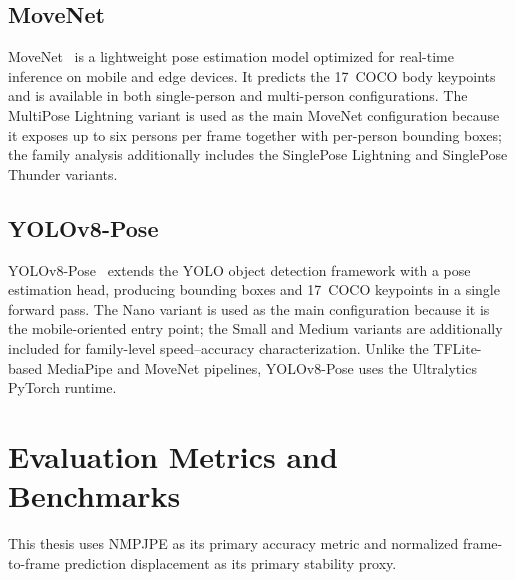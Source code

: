 \subsection{MoveNet}
\label{sec:movenet}

MoveNet~\cite{google2021movenet} is a lightweight pose estimation model optimized for real-time inference on mobile and edge devices. It predicts the 17~COCO body keypoints and is available in both single-person and multi-person configurations. The MultiPose Lightning variant is used as the main MoveNet configuration because it exposes up to six persons per frame together with per-person bounding boxes; the family analysis additionally includes the SinglePose Lightning and SinglePose Thunder variants.

\subsection{YOLOv8-Pose}
\label{sec:yolo}

YOLOv8-Pose~\cite{jocher2023yolov8} extends the YOLO object detection framework with a pose estimation head, producing bounding boxes and 17~COCO keypoints in a single forward pass. The Nano variant is used as the main configuration because it is the mobile-oriented entry point; the Small and Medium variants are additionally included for family-level speed--accuracy characterization. Unlike the TFLite-based MediaPipe and MoveNet pipelines, YOLOv8-Pose uses the Ultralytics PyTorch runtime.


\section{Evaluation Metrics and Benchmarks}
\label{sec:evaluation-metrics}

This thesis uses NMPJPE as its primary accuracy metric and normalized frame-to-frame prediction displacement as its primary stability proxy.


